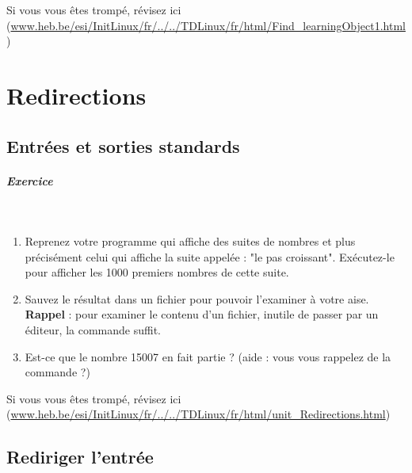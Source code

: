 \documentclass[11pt,a4paper]{article}
\begin{document}
            \par
        
			\par\medskip Si vous vous \^etes tromp\'e, r\'evisez ici (\url{www.heb.be/esi/InitLinux/fr/../../TDLinux/fr/html/Find\_learningObject1.html})
            \par
        \section{Redirections}\subsection{Entr\'ees et sorties standards}
			
		\subparagraph{Exercice} 
		
					\textcolor{white}{.} \par
				
            \par
        
					\begin{enumerate}
				
			\item 
						Reprenez votre programme qui affiche
						des suites de nombres et plus pr\'ecis\'ement
						celui qui affiche la suite appel\'ee :
						"le pas croissant".
						Ex\'ecutez-le pour
						afficher les 1000 premiers nombres de cette suite.
					
			\item 
						Sauvez le r\'esultat dans un fichier
						pour pouvoir l'examiner \`a votre aise.
						\textbf{Rappel} :
						pour examiner le contenu d'un fichier,
						inutile de passer par un \'editeur,
						la commande
						\verb@more@
						suffit.
					
			\item 
						Est-ce que le nombre 15007 en fait partie ?
						(aide : vous vous rappelez de la commande
						\verb@grep@ ?)
					
					\end{enumerate}
				Si vous vous \^etes tromp\'e, r\'evisez ici (\url{www.heb.be/esi/InitLinux/fr/../../TDLinux/fr/html/unit\_Redirections.html})
            \par
        \subsection{Rediriger l'entr\'ee}
			
\end{document}
